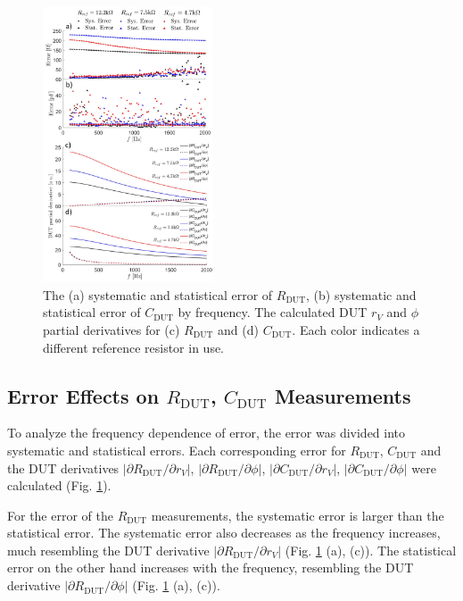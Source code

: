 \documentclass[%
 aip,
 amsmath,amssymb,
 reprint,%
]{revtex4-1}
\begin{document}
\begin{figure}
    \centering
    \includegraphics[width=0.45\textwidth]{./figures/errorandsensitivity.png}
    \caption{The (a) systematic and statistical error of $R_{\textrm{DUT}}$, (b) systematic and statistical error of $C_{\textrm{DUT}}$ by frequency. The calculated DUT $r_V$ and $\phi$ partial derivatives for (c) $R_{\textrm{DUT}}$ and (d) $C_{\textrm{DUT}}$. Each color indicates a different reference resistor in use.}
    \label{fig:error}
\end{figure}


\subsection{\label{sec:statisticalError}Error Effects on $R_{\textrm{DUT}}$, $C_{\textrm{DUT}}$ Measurements}
To analyze the frequency dependence of error, the error was divided into systematic and statistical errors. Each corresponding error for $R_{\textrm{DUT}}$, $C_{\textrm{DUT}}$ and the DUT derivatives $|\partial R_{\textrm{DUT}}/\partial r_V|$, $|\partial R_{\textrm{DUT}}/\partial \phi|$, $|\partial C_{\textrm{DUT}}/\partial r_V|$, $|\partial C_{\textrm{DUT}}/\partial \phi|$ were calculated (Fig. \ref{fig:error}). 

For the error of the $R_{\textrm{DUT}}$ measurements, the systematic error is larger than the statistical error. The systematic error also decreases as the frequency increases, much resembling the DUT derivative $|\partial R_{\textrm{DUT}}/\partial r_V|$  (Fig. \ref{fig:error} (a), (c)). The statistical error on the other hand increases with the frequency, resembling the DUT derivative $|\partial R_{\textrm{DUT}}/\partial \phi|$ (Fig. \ref{fig:error} (a), (c)). 
\end{document}
